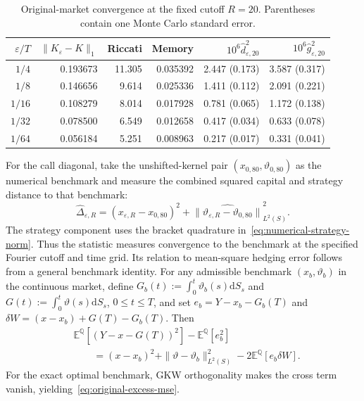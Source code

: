 \documentclass[11pt]{article}
\theoremstyle{definition}
\theoremstyle{remark}
\newcommand{\E}{\mathbb{E}}
\newcommand{\Q}{\mathbb{Q}}
\newcommand{\1}{\mathbf{1}}
\newcommand{\dd}{\mathrm{d}}
\begin{document}
\begin{table}[H]
\centering
\caption{Original-market convergence at the fixed cutoff $R=20$.
Parentheses contain one Monte Carlo standard error.}
\label{tab:fixed-cutoff-convergence}
\small
\begin{tabular}{@{}rrrrrr@{}}
\toprule
$\varepsilon/T$ & $\|K_\varepsilon-K\|_1$ & Riccati & Memory
& $10^6\widehat d_{\varepsilon,20}^2$
& $10^6\widehat g_{\varepsilon,20}^2$ \\
\midrule
$1/4$  & 0.193673 & 11.305 & 0.035392 & 2.447 (0.173) & 3.587 (0.317) \\
$1/8$  & 0.146656 &  9.614 & 0.025336 & 1.411 (0.112) & 2.091 (0.221) \\
$1/16$ & 0.108279 &  8.014 & 0.017928 & 0.781 (0.065) & 1.172 (0.138) \\
$1/32$ & 0.078500 &  6.549 & 0.012658 & 0.417 (0.034) & 0.633 (0.078) \\
$1/64$ & 0.056184 &  5.251 & 0.008963 & 0.217 (0.017) & 0.331 (0.041) \\
\bottomrule
\end{tabular}
\end{table}

For the call diagonal, take the unshifted-kernel pair
$(x_{0,80},\vartheta_{0,80})$ as the numerical benchmark and measure the
combined squared capital and strategy distance to that benchmark:
\begin{equation}
\label{eq:numerical-reference-distance}
 \widehat\Delta_{\varepsilon,R}
 =(x_{\varepsilon,R}-x_{0,80})^2
 +\widehat{\|\vartheta_{\varepsilon,R}
                   -\vartheta_{0,80}\|}_{L^2(S)}^2.
\end{equation}
The strategy component uses the bracket quadrature
in~\eqref{eq:numerical-strategy-norm}. Thus the statistic measures convergence
to the benchmark at the specified Fourier cutoff and time grid. Its relation
to mean-square hedging error follows from a general benchmark identity.
For any admissible benchmark $(x_b,\vartheta_b)$ in the continuous market,
define $G_b(t):=\int_0^t\vartheta_b(s)\dd S_s$ and
$G(t):=\int_0^t\vartheta(s)\dd S_s$, $0\leq t\leq T$, and set
$e_b=Y-x_b-G_b(T)$ and
$\delta W=(x-x_b)+G(T)-G_b(T)$. Then
\begin{equation}
\label{eq:benchmark-mse-difference}
\begin{aligned}
 &\E^\Q[(Y-x-G(T))^2]-\E^\Q[e_b^2]\\
 &\qquad=(x-x_b)^2+\|\vartheta-\vartheta_b\|_{L^2(S)}^2
          -2\E^\Q[e_b\delta W].
\end{aligned}
\end{equation}
For the exact optimal benchmark, GKW orthogonality makes the cross term
vanish, yielding~\eqref{eq:original-excess-mse}.
\end{document}
